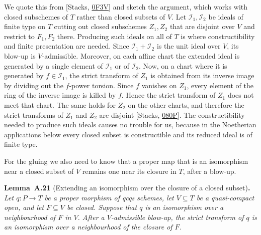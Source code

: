 \documentclass[11pt]{article}
\newenvironment{bpstatement}[2]{\par\addvspace{0.6\baselineskip}\noindent\textbf{#1}#2\textbf{.}\enspace\ignorespaces}
  {\par\addvspace{0.4\baselineskip}}
\newenvironment{bpstatementit}[2]{\begin{bpstatement}{#1}{#2}\itshape\ignorespaces}{\end{bpstatement}}
\begin{document}
\label{bp56}%
We quote this from [Stacks, \href{https://stacks.math.columbia.edu/tag/0F3V}{0F3V}] and sketch the argument, which works with closed subschemes of \(T\) rather than closed subsets of \(V\). Let \(\mathcal I_1,\mathcal I_2\) be ideals of finite type on \(T\) cutting out closed subschemes \(Z_1,Z_2\) that are disjoint over \(V\) and restrict to \(F_1,F_2\) there. Producing such ideals on all of \(T\) is where constructibility and finite presentation are needed. Since \(\mathcal I_1+\mathcal I_2\) is the unit ideal over \(V\), its blow-up is \(V\)-admissible. Moreover, on each affine chart the extended ideal is generated by a single element of \(\mathcal I_1\) or of \(\mathcal I_2\). Now, on a chart where it is generated by \(f\in\mathcal I_1\), the strict transform of \(Z_1\) is obtained from its inverse image by dividing out the \(f\)-power torsion. Since \(f\) vanishes on \(Z_1\), every element of the ring of the inverse image is killed by \(f\). Hence the strict transform of \(Z_1\) does not meet that chart. The same holds for \(Z_2\) on the other charts, and therefore the strict transforms of \(Z_1\) and \(Z_2\) are disjoint [Stacks, \href{https://stacks.math.columbia.edu/tag/080P}{080P}]. The constructibility needed to produce such ideals causes no trouble for us, because in the Noetherian applications below every closed subset is constructible and its reduced ideal is of finite type.

For the gluing we also need to know that a proper map that is an isomorphism near a closed subset of \(V\) remains one near its closure in \(T\), after a blow-up.

\label{bp57}%
\begin{bpstatementit}{Lemma~A.21}{ (Extending an isomorphism over the closure of a closed subset)}
Let \(q:P\to T\) be a proper morphism of qcqs schemes, let \(V\subseteq T\) be a quasi-compact open, and let \(F\subseteq V\) be closed. Suppose that \(q\) is an isomorphism over a neighbourhood of \(F\) in \(V\). After a \(V\)-admissible blow-up, the strict transform of \(q\) is an isomorphism over a neighbourhood of the closure of \(F\).
\end{bpstatementit}
\end{document}

